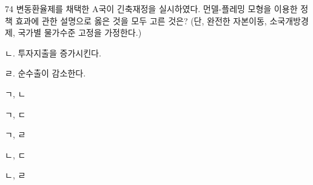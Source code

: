 \begin{question}{74}
변동환율제를 채택한 A국이 긴축재정을 실시하였다. 먼델-플레밍 모형을 이용한 정책 효과에 관한 설명으로 옳은 것을 모두 고른 것은? (단, 완전한 자본이동, 소국개방경제, 국가별 물가수준 고정을 가정한다.)
\begin{framedtext}
ㄴ. 투자지출을 증가시킨다. \par
{}ㄹ. 순수출이 감소한다. \par
\end{framedtext}
\begin{choices}
  \item ㄱ, ㄴ
  \item ㄱ, ㄷ
  \item ㄱ, ㄹ
  \item ㄴ, ㄷ
  \item ㄴ, ㄹ
\end{choices}
\end{question}
